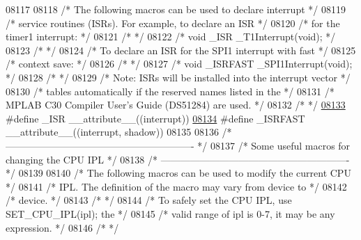 \begin{DoxyCode}
08117 
08118 \textcolor{comment}{/* The following macros can be used to declare interrupt      */}
08119 \textcolor{comment}{/* service routines (ISRs). For example, to declare an ISR    */}
08120 \textcolor{comment}{/* for the timer1 interrupt:                                  */}
08121 \textcolor{comment}{/*                                                            */}
08122 \textcolor{comment}{/* void \_ISR \_T1Interrupt(void);                              */}
08123 \textcolor{comment}{/*                                                            */}
08124 \textcolor{comment}{/* To declare an ISR for the SPI1 interrupt with fast         */}
08125 \textcolor{comment}{/* context save:                                              */}
08126 \textcolor{comment}{/*                                                            */}
08127 \textcolor{comment}{/* void \_ISRFAST \_SPI1Interrupt(void);                        */}
08128 \textcolor{comment}{/*                                                            */}
08129 \textcolor{comment}{/* Note: ISRs will be installed into the interrupt vector     */}
08130 \textcolor{comment}{/* tables automatically if the reserved names listed in the   */}
08131 \textcolor{comment}{/* MPLAB C30 Compiler User's Guide (DS51284) are used.        */}
08132 \textcolor{comment}{/*                                                            */}
\hypertarget{a00009_source_l08133}{}\hyperlink{a00009_aea8b43f2d1d9e84f03e92d9e68c9aa92}{08133} \textcolor{preprocessor}{#define \_ISR \_\_attribute\_\_((interrupt))}
\hypertarget{a00009_source_l08134}{}\hyperlink{a00009_a65a1e33fffb4853c591da45edd3789a6}{08134} \textcolor{preprocessor}{#define \_ISRFAST \_\_attribute\_\_((interrupt, shadow))}
08135 
08136 \textcolor{comment}{/* ---------------------------------------------------------- */}
08137 \textcolor{comment}{/* Some useful macros for changing the CPU IPL                */}
08138 \textcolor{comment}{/* ---------------------------------------------------------- */}
08139 
08140 \textcolor{comment}{/* The following macros can be used to modify the current CPU */}
08141 \textcolor{comment}{/* IPL. The definition of the macro may vary from device to   */}
08142 \textcolor{comment}{/* device.                                                    */}
08143 \textcolor{comment}{/*                                                            */}
08144 \textcolor{comment}{/* To safely set the CPU IPL, use SET\_CPU\_IPL(ipl); the       */}
08145 \textcolor{comment}{/* valid range of ipl is 0-7, it may be any expression.       */}
08146 \textcolor{comment}{/*                                                            */}

\end{DoxyCode}
